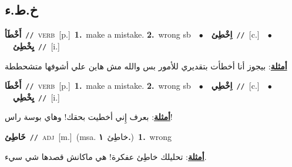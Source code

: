 \documentclass[10pt,a4paper,twoside]{article} %
\begin{document}
\begin{multicols}{2}
\vspace{-3mm}
\subsection*{\color{blue}\foreignlanguage{arabic}{خ.ط.ء}\color{blue}{}} 

{\setlength\topsep{0pt}\textbf{\foreignlanguage{arabic}{أَخْطَأ}}\ {\color{gray}\texttt{//}\color{black}}\ \textsc{verb}\ [p.]\ \textbf{1.}~make a mistake.  \textbf{2.}~wrong sb\ \ $\bullet$\ \ \setlength\topsep{0pt}\textbf{\foreignlanguage{arabic}{اِخْطِئ}}\ {\color{gray}\texttt{//}\color{black}}\ [c.]\ \ $\bullet$\ \ \setlength\topsep{0pt}\textbf{\foreignlanguage{arabic}{يِخْطِئ}}\ {\color{gray}\texttt{//}\color{black}}\ [i.]\  \begin{flushright}\color{gray}\foreignlanguage{arabic}{\textbf{\underline{\foreignlanguage{arabic}{أمثلة}}}: بيجوز أنا أخطأت بتقديري للأمور بس والله مش هاين علي أشوفها متشحططة}\end{flushright}\color{black}} \vspace{2mm}

{\setlength\topsep{0pt}\textbf{\foreignlanguage{arabic}{أَخْطَا}}\ {\color{gray}\texttt{//}\color{black}}\ \textsc{verb}\ [p.]\ \textbf{1.}~make a mistake.  \textbf{2.}~wrong sb\ \ $\bullet$\ \ \setlength\topsep{0pt}\textbf{\foreignlanguage{arabic}{اِخْطِي}}\ {\color{gray}\texttt{//}\color{black}}\ [c.]\ \ $\bullet$\ \ \setlength\topsep{0pt}\textbf{\foreignlanguage{arabic}{يِخْطِي}}\ {\color{gray}\texttt{//}\color{black}}\ [i.]\  \begin{flushright}\color{gray}\foreignlanguage{arabic}{\textbf{\underline{\foreignlanguage{arabic}{أمثلة}}}: بعرف إِني أخطيت بحقك! وهاي بوسة راس!}\end{flushright}\color{black}} \vspace{2mm}

{\setlength\topsep{0pt}\textbf{\foreignlanguage{arabic}{خَاطِئ}}\ {\color{gray}\texttt{//}\color{black}}\ \textsc{adj}\ [m.]\ \color{gray}(msa. \foreignlanguage{arabic}{خاطِئ}~\foreignlanguage{arabic}{\textbf{١.}})\color{black}\ \textbf{1.}~wrong\  \begin{flushright}\color{gray}\foreignlanguage{arabic}{\textbf{\underline{\foreignlanguage{arabic}{أمثلة}}}: تحليلك خاطِئ عفكرة! هي ماكانش قصدها شي سيء.}\end{flushright}\color{black}} \vspace{2mm}


\end{multicols}
\end{document}
